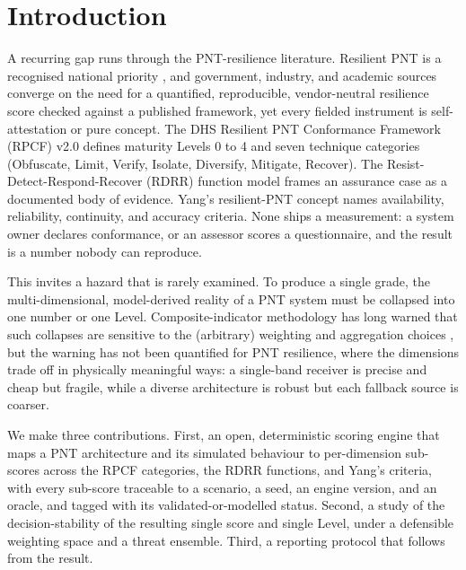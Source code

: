 \documentclass[conference]{IEEEtran}
\begin{document}
\section{Introduction}
A recurring gap runs through the PNT-resilience literature. Resilient PNT is a recognised national priority \cite{eo13905}, and government, industry, and academic sources converge on the need for a quantified, reproducible, vendor-neutral resilience score checked against a published framework, yet every fielded instrument is self-attestation or pure concept. The DHS Resilient PNT Conformance Framework (RPCF) v2.0 \cite{rpcf} defines maturity Levels 0 to 4 and seven technique categories (Obfuscate, Limit, Verify, Isolate, Diversify, Mitigate, Recover). The Resist-Detect-Respond-Recover (RDRR) function model \cite{rethinkpnt} frames an assurance case as a documented body of evidence. Yang's resilient-PNT concept \cite{yang} names availability, reliability, continuity, and accuracy criteria. None ships a measurement: a system owner declares conformance, or an assessor scores a questionnaire, and the result is a number nobody can reproduce.

This invites a hazard that is rarely examined. To produce a single grade, the multi-dimensional, model-derived reality of a PNT system must be collapsed into one number or one Level. Composite-indicator methodology has long warned that such collapses are sensitive to the (arbitrary) weighting and aggregation choices \cite{saisana,oecd,saltelli}, but the warning has not been quantified for PNT resilience, where the dimensions trade off in physically meaningful ways: a single-band receiver is precise and cheap but fragile, while a diverse architecture is robust but each fallback source is coarser.

We make three contributions. First, an open, deterministic scoring engine that maps a PNT architecture and its simulated behaviour to per-dimension sub-scores across the RPCF categories, the RDRR functions, and Yang's criteria, with every sub-score traceable to a scenario, a seed, an engine version, and an oracle, and tagged with its validated-or-modelled status. Second, a study of the decision-stability of the resulting single score and single Level, under a defensible weighting space and a threat ensemble. Third, a reporting protocol that follows from the result.
\end{document}
